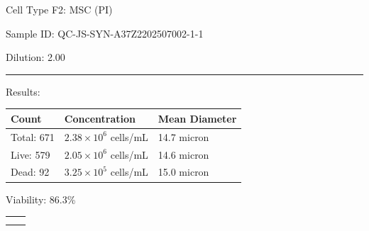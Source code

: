 \documentclass[UTF8,10pt,a4paper,fontset=fandol]{ctexart}
\newcommand{\fieldvalue}[1]{#1}
\begin{document}
\begin{center}
\begin{center}
Cell Type F2: %
\fieldvalue{MSC (PI)}

\medskip

Sample ID: %
\fieldvalue{QC-JS-SYN-A37Z2202507002-1-1}

Dilution: %
\fieldvalue{2.00}

\medskip
\hrule
\medskip

Results:

\medskip

\begin{tabularx}{\textwidth}{@{}lXX@{}}
\textbf{Count} & \textbf{Concentration} & \textbf{Mean Diameter} \\
\hline
Total: %
\fieldvalue{671}
&
\fieldvalue{$2.38\times10^{6}$ cells/mL}
&
\fieldvalue{14.7 micron}
\\
Live: %
\fieldvalue{579}
&
\fieldvalue{$2.05\times10^{6}$ cells/mL}
&
\fieldvalue{14.6 micron}
\\
Dead: %
\fieldvalue{92}
&
\fieldvalue{$3.25\times10^{5}$ cells/mL}
&
\fieldvalue{15.0 micron}
\end{tabularx}

\medskip

Viability: %
\fieldvalue{86.3\%}

\medskip

\begin{center}
\begin{tabular}{cc}
\fbox{\rule{0pt}{0.22\textheight}\rule{0.43\textwidth}{0pt}}
&
\fbox{\rule{0pt}{0.22\textheight}\rule{0.43\textwidth}{0pt}}
\\[1em]
\fbox{\rule{0pt}{0.22\textheight}\rule{0.43\textwidth}{0pt}}
&
\fbox{\rule{0pt}{0.22\textheight}\rule{0.43\textwidth}{0pt}}
\end{tabular}
\end{center}


\end{center}
\end{center}
\end{document}
